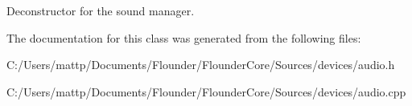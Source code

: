 Deconstructor for the sound manager. 



The documentation for this class was generated from the following files\+:\begin{DoxyCompactItemize}
\item 
C\+:/\+Users/mattp/\+Documents/\+Flounder/\+Flounder\+Core/\+Sources/devices/audio.\+h\item 
C\+:/\+Users/mattp/\+Documents/\+Flounder/\+Flounder\+Core/\+Sources/devices/audio.\+cpp\end{DoxyCompactItemize}
